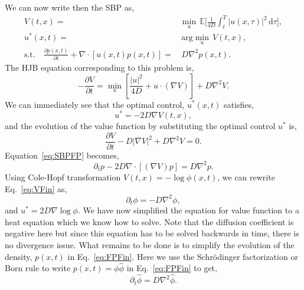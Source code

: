 \documentclass[11pt]{article}
\def\d{\mathrm{d}}
\def\E{\mathbb{E}}
\def\d{\text{d}}
\def\grad{\vec{\nabla}}
\def\grad{\nabla}
\def\phih{\hat{\phi}}
\begin{document}
\begin{singlespace}
\noindent We can now write then the SBP as,
\begin{align}
    V(t, x) =& \min_u\,\E\bigg[ \frac{1}{4D} \int_t^T |u(x, \tau)|^2\,\d \tau \bigg], \\
    u^*(x, t)=&\,\text{arg}\min_u\,V(t, x),\\
    \text{s.t.}\quad \frac{\partial p(x, t)}{\partial t} + \grad \cdot [u(x, t) p(x, t)] =&\,D \grad^2 p(x, t).
\end{align}
The HJB equation corresponding to this problem is,
\[
    -\frac{\partial V}{\partial t} = \min_{u} \left[ \frac{|u|^2}{4D} + u \cdot (\grad V) \right] + D \grad^2 V.
\]
We can immediately see that the optimal control, $u^*(x, t)$ satisfies,
\begin{equation}
    u^* = -2D \grad V(t, x),
\end{equation}
and the evolution of the value function by substituting the optimal control $u^*$ is,
\begin{equation}
    \frac{\partial V}{\partial t} - D |\grad V|^2 + D \grad^2 V = 0. \label{eq:VFin}
\end{equation}
Equation~\ref{eq:SBPFP} becomes,
\begin{equation}
\partial_t p - 2D \grad \cdot [ (\grad V) p] = D \grad^2 p. \label{eq:FPFin}
\end{equation}
Using Cole-Hopf transformation $V(t, x) = - \log \phi(x, t)$, we can rewrite Eq.~\ref{eq:VFin} as,
\[
\partial_t \phi = - D \nabla^2 \phi,
\]
and $u^* = 2 D \grad \log \phi$.
We have now simplified the equation for value function to a heat equation which we know how to solve. Note that the diffusion coefficient is negative here but since this equation has to be solved backwards in time, there is no divergence issue. What remains to be done is to simplify the evolution of the density, $p(x, t)$ in Eq.~\ref{eq:FPFin}. Here we use the Schr\"odinger factorization or Born rule to write $p(x, t) = \phi \phih$ in Eq.~\ref{eq:FPFin} to get,
\[
\partial_t \phih = D \nabla^2 \phih.
\]

\end{singlespace}
\end{document}

